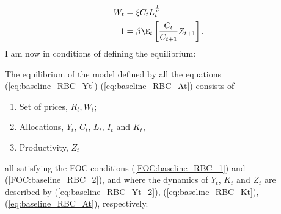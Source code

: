 \begin{align}
	W_t &=\xi C_tL_t^{\frac{1}{\nu}} \label{FOC:baseline_RBC_1}\\
	1 & = \beta\E_t\left[\frac{C_t}{C_{t+1}}Z_{t+1}\right]\label{FOC:baseline_RBC_2}.
\end{align}
I am now in conditions of defining the equilibrium:
\begin{defi}
	The equilibrium of the model defined by all the equations (\ref{eq:baseline_RBC_Yt})-(\ref{eq:baseline_RBC_At}) consists of
	\begin{enumerate}
		\item Set of prices, $R_t, W_t$;
		\item Allocations, $Y_t$, $C_t$, $L_t$, $I_t$ and $K_t$,
		\item Productivity, $Z_t$
	\end{enumerate}
	all satisfying the FOC conditions (\ref{FOC:baseline_RBC_1}) and (\ref{FOC:baseline_RBC_2}), and where the dynamics of $Y_t$, $K_t$ and $Z_t$ are described by (\ref{eq:baseline_RBC_Yt_2}), (\ref{eq:baseline_RBC_Kt}), (\ref{eq:baseline_RBC_At}), respectively.
\end{defi}

